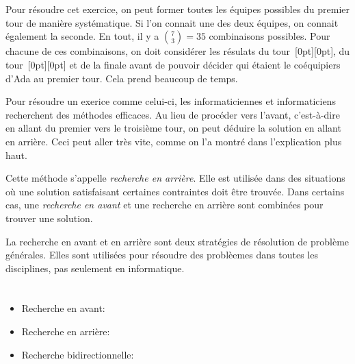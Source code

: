 {{%
\section*{\BrochureItsInformatics}
Pour résoudre cet exercice, on peut former toutes les équipes possibles du premier tour de manière systématique. Si l’on connait une des deux équipes, on connait également la seconde. En tout, il y a ${{7 \choose 3} = 35}$ combinaisons possibles. Pour chacune de ces combinaisons, on doit considérer les résulats du tour~\raisebox{-0.5ex}[0pt][0pt]{}, du tour~\raisebox{-0.5ex}[0pt][0pt]{} et de la finale avant de pouvoir décider qui étaient le coéquipiers d’Ada au premier tour. Cela prend beaucoup de temps.

Pour résoudre un exerice comme celui-ci, les informaticiennes et informaticiens recherchent des méthodes efficaces. Au lieu de procéder vers l’avant, c’est-à-dire en allant du premier vers le troisième tour, on peut déduire la solution en allant en arrière. Ceci peut aller très vite, comme on l’a montré dans l’explication plus haut.

Cette méthode s’appelle \emph{recherche en arrière}. Elle est utilisée dans des situations où une solution satisfaisant certaines contraintes doit être trouvée. Dans certains cas, une \emph{recherche en avant} et une recherche en arrière sont combinées pour trouver une solution.

La recherche en avant et en arrière sont deux stratégies de résolution de problème générales. Elles sont utilisées pour résoudre des problèemes dans toutes les disciplines, pas seulement en informatique.



\section*{\BrochureWebsitesAndKeywords}
{\raggedright
\begin{itemize}
  \item Recherche en avant: \href{https://fr.wikipedia.org/wiki/Algorithme_de_Dijkstra}{}
  \item Recherche en arrière: \href{https://fr.wikipedia.org/wiki/Algorithme_A*}{}
  \item Recherche bidirectionnelle: \href{https://fr.acervolima.com/recherche-bidirectionnelle/}{}
\end{itemize}


}}}
